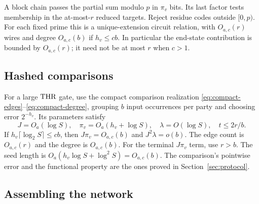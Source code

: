 A block chain passes the partial sum modulo $p$ in $\pi_v$ bits.
Its last factor tests membership in the at-most-$r$ reduced targets.
Reject residue codes outside $[0,p)$. For each fixed prime this is a
unique-extension circuit relation, with $O_{a,c}(r)$ wires and degree
$O_{a,c}(b)$ if $h_v\le cb$. In particular the end-state contribution
is bounded by $O_{a,c}(r)$; it need not be at most $r$ when $c>1$.

\subsection{Hashed comparisons}

For a large $\mathrm{THR}$ gate, use the compact comparison realization
\eqref{eq:compact-edges}--\eqref{eq:compact-degree}, grouping $b$
input occurrences per party and choosing error $2^{-h_v}$. Its
parameters satisfy
\[
 J=O_a(\log S),\quad \pi_v=O_a(h_v+\log S),\quad
 \lambda=O(\log S),\quad t\le2r/b.
\]
If $h_v\lceil\log_2S\rceil\le cb$, then
$J\pi_v=O_{a,c}(b)$ and $J^2\lambda=o(b)$. The edge count is
$O_{a,c}(r)$ and the degree is $O_{a,c}(b)$. For the terminal
$J\pi_v$ term, use $r>b$. The seed length is
$O_a(h_v\log S+\log^2S)=O_{a,c}(b)$.
The comparison's pointwise error and the functional property are the
ones proved in Section~\ref{sec:protocol}.

\subsection{Assembling the network}

